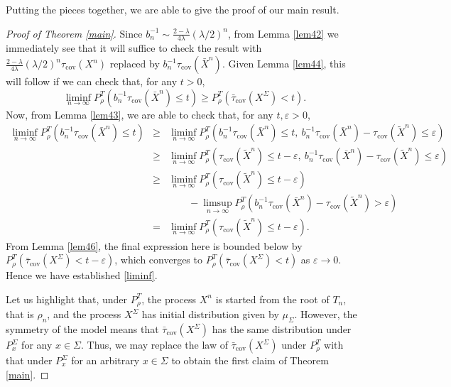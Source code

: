 \documentclass[a4paper, 11pt]{article}
\begin{document}
Putting the pieces together, we are able to give the proof of our main result.

\begin{proof}[Proof of Theorem \ref{main}]
Since $b_n^{-1}\sim \frac{2-\lambda}{4\lambda}(\lambda/2)^n$, from Lemma \ref{lem42} we immediately see that it will suffice to check the result with $\frac{2-\lambda}{4\lambda}(\lambda/2)^n\tau_{\mathrm{cov}}({X}^n)$ replaced by $b_n^{-1}\tau_{\mathrm{cov}}(\bar{X}^n)$. Given Lemma \ref{lem44}, this will follow if we can check that, for any $t>0$,
\begin{equation}\label{liminf}
\liminf_{n\rightarrow\infty}P_\rho^T\left(b_n^{-1}\tau_{\mathrm{cov}}(\bar{X}^n)\leq t\right)\geq P_\rho^T\left(\bar\tau_{\mathrm{cov}}({X}^\Sigma)< t\right).
\end{equation}
Now, from Lemma \ref{lem43}, we are able to check that, for any $t,\varepsilon>0$,
\begin{eqnarray*}
\liminf_{n\rightarrow\infty}P_\rho^T\left(b_n^{-1}\tau_{\mathrm{cov}}(\bar{X}^n)\leq t\right)&\geq&\liminf_{n\rightarrow\infty}P_\rho^T\left(b_n^{-1}\tau_{\mathrm{cov}}(\bar{X}^n)\leq t,\:b_n^{-1}\tau_{\mathrm{cov}}(\bar{X}^n)-\tau_{\mathrm{cov}}(\tilde{X}^n)\leq\varepsilon\right)\\
&\geq &\liminf_{n\rightarrow\infty}P_\rho^T\left(\tau_{\mathrm{cov}}(\tilde{X}^n)\leq t-\varepsilon,\:b_n^{-1}\tau_{\mathrm{cov}}(\bar{X}^n)-\tau_{\mathrm{cov}}(\tilde{X}^n)\leq\varepsilon\right)\\
&\geq &\liminf_{n\rightarrow\infty}P_\rho^T\left(\tau_{\mathrm{cov}}(\tilde{X}^n)\leq t-\varepsilon\right)\\
&&\qquad-\limsup_{n\rightarrow\infty}P_\rho^T\left(b_n^{-1}\tau_{\mathrm{cov}}(\bar{X}^n)-\tau_{\mathrm{cov}}(\tilde{X}^n)>\varepsilon\right)\\
&=&\liminf_{n\rightarrow\infty}P_\rho^T\left(\tau_{\mathrm{cov}}(\tilde{X}^n)\leq t-\varepsilon\right).
\end{eqnarray*}
From Lemma \ref{lem46}, the final expression here is bounded below by $P_\rho^T(\bar\tau_{\mathrm{cov}}({X}^\Sigma)<t-\varepsilon)$, which converges to $P_\rho^T(\bar\tau_{\mathrm{cov}}({X}^\Sigma)<t)$ as $\varepsilon\rightarrow 0$. Hence we have established \eqref{liminf}.

Let us highlight that, under $P_\rho^T$, the process $X^n$ is started from the root of $T_n$, that is $\rho_n$, and the process $X^\Sigma$ has initial distribution given by $\mu_\Sigma$. However, the symmetry of the model means that $\bar\tau_{\mathrm{cov}}({X}^\Sigma)$ has the same distribution under $P_x^\Sigma$ for any $x\in \Sigma$. Thus, we may replace the law of $\bar\tau_{\mathrm{cov}}({X}^\Sigma)$ under $P_\rho^T$ with that under $P_x^\Sigma$ for an arbitrary $x\in \Sigma$ to obtain the first claim of Theorem \ref{main}.


\end{proof}
\end{document}
